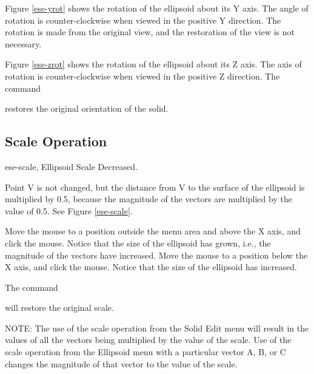 Figure \ref{ese-yrot} shows the rotation of the ellipsoid about its Y axis.
The angle
of rotation is counter-clockwise when viewed in the positive Y direction.  The
rotation is made from the original view, and the restoration of the view is
not necessary.


Figure \ref{ese-zrot} shows the rotation of the ellipsoid about its Z axis.
The axis
of rotation is counter-clockwise when viewed in the positive Z direction.
The command


restores the original orientation of the solid.

\subsection{Scale Operation}
\mfig ese-scale, Ellipsoid Scale Decreased.


Point V is not changed,
but the distance from V to the surface of the ellipsoid is multiplied by 0.5,
because the magnitude of the vectors are multiplied by the value of 0.5.
See Figure \ref{ese-scale}.

Move the mouse to a position outside the menu area and above the X axis,
and click the mouse.
Notice that the size of the ellipsoid has grown, i.e.,
the magnitude of the vectors have increased.
Move the mouse to a position below the X axis, and click the mouse.
Notice that the size of the ellipsoid has increased.

The command


will restore the original scale.

NOTE:
The use
of the scale operation from the Solid Edit menu
will result in the values of all the vectors being
multiplied by the value of the scale.
Use of the scale operation from the Ellipsoid menu
with a particular vector A, B, or C changes the
magnitude of that vector to the value of the scale.

